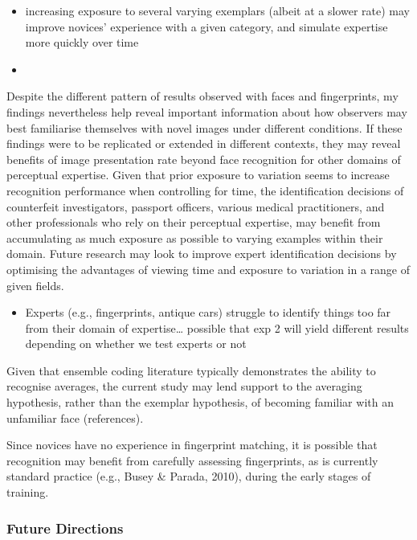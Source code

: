\documentclass[
  english,
  man]{apa6}
\providecommand{\tightlist}{%
  \setlength{\itemsep}{0pt}\setlength{\parskip}{0pt}}
\begin{document}
\begin{itemize}
\tightlist
\item
  increasing exposure to several varying exemplars (albeit at a slower rate) may improve novices' experience with a given category, and simulate expertise more quickly over time
\item
\end{itemize}

Despite the different pattern of results observed with faces and fingerprints, my findings nevertheless help reveal important information about how observers may best familiarise themselves with novel images under different conditions. If these findings were to be replicated or extended in different contexts, they may reveal benefits of image presentation rate beyond face recognition for other domains of perceptual expertise. Given that prior exposure to variation seems to increase recognition performance when controlling for time, the identification decisions of counterfeit investigators, passport officers, various medical practitioners, and other professionals who rely on their perceptual expertise, may benefit from accumulating as much exposure as possible to varying examples within their domain. Future research may look to improve expert identification decisions by optimising the advantages of viewing time and exposure to variation in a range of given fields.

\begin{itemize}
\tightlist
\item
  Experts (e.g., fingerprints, antique cars) struggle to identify things too far from their domain of expertise\ldots{} possible that exp 2 will yield different results depending on whether we test experts or not
\end{itemize}

Given that ensemble coding literature typically demonstrates the ability to recognise averages, the current study may lend support to the averaging hypothesis, rather than the exemplar hypothesis, of becoming familiar with an unfamiliar face (references).

Since novices have no experience in fingerprint matching, it is possible that recognition may benefit from carefully assessing fingerprints, as is currently standard practice (e.g., Busey \& Parada, 2010), during the early stages of training.

\hypertarget{future-directions}{%
\subsubsection{Future Directions}\label{future-directions}}
\end{document}
